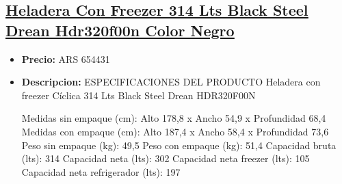 \documentclass{article}
\begin{document}
    
    \begin{adjustwidth}{2em}{}

    \subsection{\underline{\href{https://www.mercadolibre.com.ar/heladera-con-freezer-314-lts-black-steel-drean-hdr320f00n-color-negro/p/MLA20722121}{Heladera Con Freezer 314 Lts Black Steel Drean Hdr320f00n Color Negro}}}
    \begin{itemize}
        \item \textbf{Precio:} ARS 654431
        \item \textbf{Descripcion:} ESPECIFICACIONES DEL PRODUCTO
Heladera con freezer Cíclica 314 Lts Black Steel Drean HDR320F00N

Medidas sin empaque (cm): Alto 178,8 x Ancho 54,9 x Profundidad 68,4
Medidas con empaque (cm): Alto 187,4 x Ancho 58,4 x Profundidad 73,6
Peso sin empaque (kg): 49,5
Peso con empaque (kg): 51,4
Capacidad bruta (lts): 314
Capacidad neta (lts): 302
Capacidad neta freezer (lts): 105
Capacidad neta refrigerador (lts): 197


\end{itemize}
\end{adjustwidth}
\end{document}
